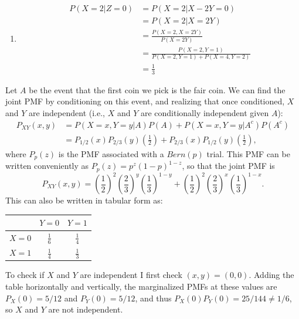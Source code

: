\begin{problem}{2}
\begin{enumerate}
\item 
\begin{align*}
P(X=2|Z=0) & = P(X=2|X-2Y=0) \\
 & = P(X=2|X=2Y) \\
  & = \frac{P(X=2, X=2Y)}{P(X=2Y)} \\
    & = \frac{P(X=2, Y=1)}{P(X=2, Y=1)+P(X=4, Y=2)} \\
    & = \frac{1}{3}
\end{align*}

\end{enumerate}
\end{problem}

\begin{problem}{3}
Let $A$ be the event that the first coin we pick is the fair coin.  We can find the joint PMF by conditioning on this event, and realizing that once conditioned, $X$ and $Y$ are independent (i.e., $X$ and $Y$ are conditionally independent given $A$):
\begin{align*}
P_{XY}(x, y) &= P(X=x, Y=y|A)P(A)+P(X=x, Y=y|A^c)P(A^c) \\
&= P_{1/2}(x) P_{2/3}(y)\left(\frac{1}{2}\right)+P_{2/3}(x) P_{1/2}(y)\left(\frac{1}{2}\right),
\end{align*}
where $P_{p}(z)$ is the PMF associated with a $Bern(p)$ trial.  This PMF can be written conveniently as $P_{p}(z)=p^z(1-p)^{1-z}$, so that the joint PMF is
\begin{equation*}
P_{XY}(x, y) = \left( \frac{1}{2} \right)^2 \left( \frac{2}{3} \right)^y \left( \frac{1}{3} \right)^{1-y}+\left( \frac{1}{2} \right )^2 \left( \frac{2}{3} \right)^x \left( \frac{1}{3}\right)^{1-x}.
\end{equation*}
This can also be written in tabular form as:

\begin{center}
\bgroup
\def\arraystretch{2.5}
  \begin{tabular}{ | c | c | c |}
    \hline
     & $Y=0$ & $Y=1$ \\  \hline
    $X=0$ &$\frac{1}{6}$ & $\frac{1}{4}$ \\ \hline
    $X=1$ & $\frac{1}{4}$ & $\frac{1}{3}$ \\
    \hline
  \end{tabular}
  \egroup
\end{center}
To check if $X$ and $Y$ are independent I first check $(x, y)=(0,0)$.  Adding the table horizontally and vertically, the marginalized PMFs at these values are $P_X(0) = 5/12$ and $P_Y(0) = 5/12$, and thus $P_X(0)P_Y(0) = 25/144 \neq 1/6$, so $X$ and $Y$ are not independent.
\end{problem}

